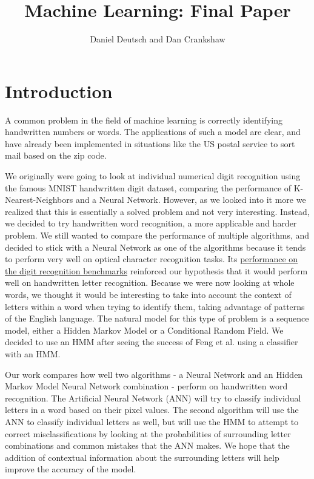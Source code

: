 \documentclass[11pt,a4paper,twocolumn]{article}
\author{Daniel Deutsch and Dan Crankshaw}
\title{Machine Learning: Final Paper}
\date{}
\begin{document}
\maketitle

\section{Introduction}

A common problem in the field of machine learning is correctly identifying
handwritten numbers or words. The applications of
such a model are clear, and have already been implemented in situations like
the US postal service to sort mail based on the zip code.

We originally were going to look at individual numerical digit recognition using the famous
MNIST handwritten digit dataset, comparing the performance of K-Nearest-Neighbors and a
Neural Network. However, as we looked into it more we realized that this is essentially a solved
problem and not very interesting. Instead, we decided to try handwritten word recognition,
a more applicable and harder problem. We still wanted to compare the performance of multiple
algorithms, and decided to stick with a Neural Network as one of the algorithms because it tends to
perform very well on optical character recognition tasks. Its \href{http://yann.lecun.com/exdb/mnist/index.html}{performance on the digit recognition benchmarks} reinforced our hypothesis that it would perform well on handwritten letter
recognition. Because we were now looking at whole words, we thought it would be interesting to take
into account the context of letters within a word when trying to identify them, taking advantage of
patterns of the English language. The natural model for this type of problem is a sequence model,
either a Hidden Markov Model or a Conditional Random Field. We decided to use an HMM after seeing
the success of Feng et al.\cite{feng2008hidden} using a classifier with an HMM.

Our work compares how well two algorithms - a Neural Network and an Hidden Markov Model Neural
Network combination - perform on handwritten word recognition. The Artificial Neural Network (ANN) will
try to classify individual letters in a word based on their pixel values. The second algorithm will
use the ANN to classify individual letters as well, but will use the HMM to attempt to correct
misclassifications by looking at the probabilities of surrounding letter combinations and common
mistakes that the ANN makes. We hope that the addition of contextual information
about the surrounding letters will help improve the accuracy of the model.
\end{document}
